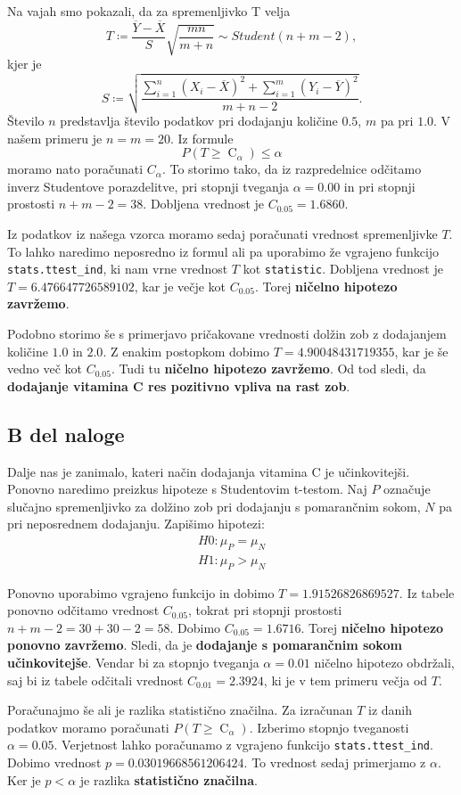 \documentclass{article}
\DeclareMathOperator{\CM}{C}
\begin{document}
Na vajah smo pokazali, da za spremenljivko T velja
    \[
        T \coloneqq \frac{\overline{Y} - \overline{X}}{S}\sqrt{\frac{mn}{m + n}} \sim Student(n + m - 2),
    \]
    kjer je
    \[
        S \coloneqq \sqrt{\frac{\sum_{i = 1}^n (X_{i} - \overline{X})^2 + \sum_{i = 1}^m (Y_{i} - \overline{Y})^2}{m + n - 2}}.
    \]
Število $n$ predstavlja število podatkov pri dodajanju količine $0.5$, $m$ pa pri $1.0$. V našem primeru je $n=m=20$.
Iz formule
\[
        P(T \geq \CM_{\alpha}) \leq \alpha 
    \]
moramo nato poračunati $C_{\alpha}$. To storimo tako, da iz razpredelnice odčitamo inverz Studentove porazdelitve,
pri stopnji tveganja $\alpha = 0.00$ in pri stopnji prostosti $n + m -2 = 38$.
Dobljena vrednost je $C_{0.05} = 1.6860$.

Iz podatkov iz našega vzorca moramo sedaj poračunati vrednost spremenljivke $T$. To lahko naredimo 
neposredno iz formul ali pa uporabimo že vgrajeno funkcijo \texttt{stats.ttest\_ind},
ki nam vrne vrednost $T$ kot \texttt{statistic}. Dobljena vrednost je $T=6.476647726589102$, 
kar je večje kot $C_{0.05}$. Torej \textbf{ničelno hipotezo zavržemo}.

Podobno storimo še s primerjavo pričakovane vrednosti dolžin zob z dodajanjem količine $1.0$ in $2.0$.
Z enakim postopkom dobimo $T = 4.90048431719355$, kar je še vedno več kot $C_{0.05}$. Tudi tu \textbf{ničelno hipotezo 
zavržemo}. Od tod sledi, da \textbf{dodajanje vitamina C res pozitivno vpliva na rast zob}.


\subsection{B del naloge}
Dalje nas je zanimalo, kateri način dodajanja vitamina C je učinkovitejši. Ponovno naredimo preizkus hipoteze s
Studentovim t-testom.
Naj $P$ označuje slučajno spremenljivko za dolžino zob pri dodajanju s pomarančnim sokom, $N$ pa pri neposrednem dodajanju.
Zapišimo hipotezi:
\begin{align}
    H0: \mu_P = \mu_N \\
    H1: \mu_P > \mu_N
\end{align}

Ponovno uporabimo vgrajeno funkcijo in dobimo $T = 1.91526826869527$.
Iz tabele ponovno odčitamo vrednost $C_{0.05}$, tokrat pri stopnji prostosti
$n + m - 2= 30 + 30 - 2 = 58$. Dobimo $C_{0.05} = 1.6716$. 
Torej \textbf{ničelno hipotezo ponovno zavržemo}. Sledi, da je \textbf{dodajanje s pomarančnim sokom učinkovitejše}.
Vendar bi za stopnjo tveganja $\alpha=0.01$ ničelno hipotezo obdržali, saj bi iz tabele 
odčitali vrednost $C_{0.01} = 2.3924$, ki je v tem primeru večja od $T$.

Poračunajmo še ali je razlika statistično značilna. Za izračunan $T$ iz danih podatkov moramo 
poračunati $P(T \geq \CM_{\alpha})$. Izberimo stopnjo tveganosti $\alpha = 0.05$.
Verjetnost lahko poračunamo z vgrajeno funkcijo \texttt{stats.ttest\_ind}.
Dobimo vrednost $p=0.03019668561206424$. To vrednost sedaj primerjamo z $\alpha$. Ker je 
$p < \alpha$ je razlika \textbf{statistično značilna}.
\end{document}
